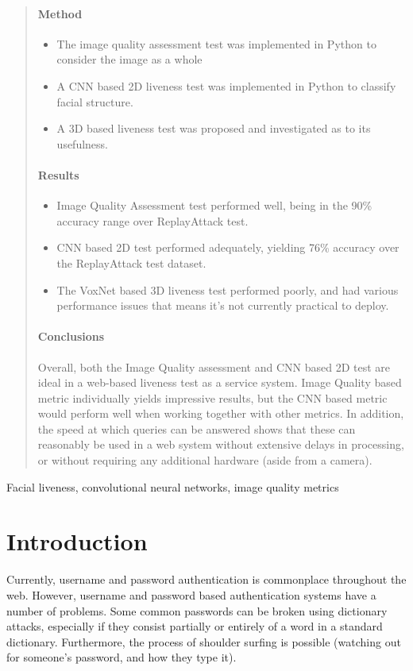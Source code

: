 \documentclass[10pt,a4paper]{article}
\begin{document}
\begin{abstract}
\paragraph{Method}
   \begin{itemize}
        \item The image quality assessment test was implemented in Python to consider the image as a whole
        \item A CNN based 2D liveness test was implemented in Python to classify facial structure.
        \item A 3D based liveness test was proposed and investigated as to its usefulness.
   \end{itemize}
\paragraph{Results}
    \begin{itemize}
        \item Image Quality Assessment test performed well, being in the 90\% accuracy range over ReplayAttack test.
        \item CNN based 2D test performed adequately, yielding 76\% accuracy over the ReplayAttack test dataset.
        \item The VoxNet based 3D liveness test performed poorly, and had various performance issues that means it's not currently practical to deploy.
    \end{itemize}
\paragraph{Conclusions}
    Overall, both the Image Quality assessment and CNN based 2D test are ideal in a web-based liveness test as a service system. Image Quality based metric individually yields
    impressive results, but the CNN based metric would perform well when working together with other metrics. In addition, the speed at which queries can be answered shows 
    that these can reasonably be used in a web system without extensive delays in processing, or without requiring any additional hardware (aside from a camera).
\end{abstract}

\begin{keywords}
Facial liveness, convolutional neural networks, image quality metrics
\end{keywords}

\section{Introduction}
    Currently, username and password authentication is commonplace throughout the web. However, username and password
    based authentication systems have a number of problems. Some common passwords can be broken using dictionary attacks,
    especially if they consist partially or entirely of a word in a standard dictionary. Furthermore, the process of shoulder surfing is possible (watching out
    for someone's password, and how they type it).
\end{document}
